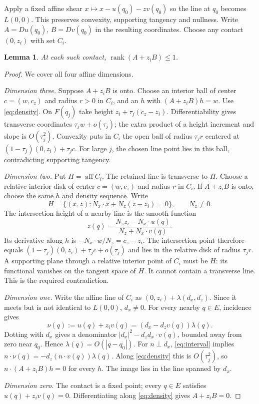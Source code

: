 \documentclass[11pt]{article}
\DeclareMathOperator{\aff}{aff}
\DeclareMathOperator{\rank}{rank}
\newtheorem{lemma}[theorem]{Lemma}
\theoremstyle{remark}
\begin{document}
Apply a fixed affine shear $x\mapsto x-u(q_0)-zv(q_0)$ so the line at $q_0$ becomes $L(0,0)$. This preserves convexity, supporting tangency and nullness. Write $A=Du(q_0)$, $B=Dv(q_0)$ in the resulting coordinates. Choose any contact $(0,z_i)$ with set $C_i$.
\begin{lemma}\label{lem:rank}
At each such contact, $\rank(A+z_iB)\le1$.
\end{lemma}
\begin{proof}
We cover all four affine dimensions.

\emph{Dimension three.} Suppose $A+z_iB$ is onto. Choose an interior ball of center $c=(w,c_z)$ and radius $r>0$ in $C_i$, and an $h$ with $(A+z_iB)h=w$. Use \eqref{eq:density}. On $F(q_j)$ take height $z_i+\tau_j(c_z-z_i)$. Differentiability gives transverse coordinates $\tau_jw+o(\tau_j)$; the extra product of a height increment and slope is $O(\tau_j^2)$. Convexity puts in $C_i$ the open ball of radius $\tau_jr$ centered at $(1-\tau_j)(0,z_i)+\tau_jc$. For large $j$, the chosen line point lies in this ball, contradicting supporting tangency.

\emph{Dimension two.} Put $H=\aff C_i$. The retained line is transverse to $H$. Choose a relative interior disk of center $c=(w,c_z)$ and radius $r$ in $C_i$. If $A+z_iB$ is onto, choose the same $h$ and density sequence. Write
\[
H=\{(x,z):N_x\cdot x+N_z(z-z_i)=0\},\qquad N_z\ne0.
\]
The intersection height of a nearby line is the smooth function
\[
z(q)=\frac{N_zz_i-N_x\cdot u(q)}{N_z+N_x\cdot v(q)}.
\]
Its derivative along $h$ is $-N_x\cdot w/N_z=c_z-z_i$. The intersection point therefore equals $(1-\tau_j)(0,z_i)+\tau_jc+o(\tau_j)$ and lies in the relative disk of radius $\tau_jr$. A supporting plane through a relative interior point of $C_i$ must be $H$: its functional vanishes on the tangent space of $H$. It cannot contain a transverse line. This is the required contradiction.

\emph{Dimension one.} Write the affine line of $C_i$ as $(0,z_i)+\lambda(d_x,d_z)$. Since it meets but is not identical to $L(0,0)$, $d_x\ne0$. For every nearby $q\in E$, incidence gives
\begin{equation}\label{eq:interval}
\nu(q):=u(q)+z_iv(q)=(d_x-d_zv(q))\lambda(q).
\end{equation}
Dotting with $d_x$ gives a denominator $|d_x|^2-d_zd_x\cdot v(q)$, bounded away from zero near $q_0$. Hence $\lambda(q)=O(|q-q_0|)$. For $n\perp d_x$, \eqref{eq:interval} implies $n\cdot\nu(q)=-d_z(n\cdot v(q))\lambda(q)$. Along \eqref{eq:density} this is $O(\tau_j^2)$, so $n\cdot(A+z_iB)h=0$ for every $h$. The image lies in the line spanned by $d_x$.

\emph{Dimension zero.} The contact is a fixed point; every $q\in E$ satisfies $u(q)+z_iv(q)=0$. Differentiating along \eqref{eq:density} gives $A+z_iB=0$.
\end{proof}
\end{document}
